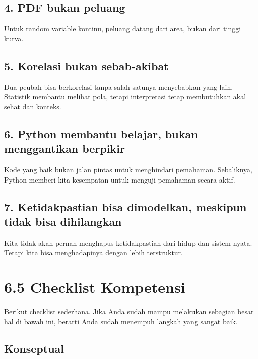 \documentclass[
  letterpaper,
  DIV=11,
  numbers=noendperiod]{scrreprt}
\begin{document}
\subsection{4. PDF bukan peluang}\label{pdf-bukan-peluang}

Untuk random variable kontinu, peluang datang dari area, bukan dari
tinggi kurva.

\subsection{5. Korelasi bukan
sebab-akibat}\label{korelasi-bukan-sebab-akibat}

Dua peubah bisa berkorelasi tanpa salah satunya menyebabkan yang lain.
Statistik membantu melihat pola, tetapi interpretasi tetap membutuhkan
akal sehat dan konteks.

\subsection{6. Python membantu belajar, bukan menggantikan
berpikir}\label{python-membantu-belajar-bukan-menggantikan-berpikir}

Kode yang baik bukan jalan pintas untuk menghindari pemahaman.
Sebaliknya, Python memberi kita kesempatan untuk menguji pemahaman
secara aktif.

\subsection{7. Ketidakpastian bisa dimodelkan, meskipun tidak bisa
dihilangkan}\label{ketidakpastian-bisa-dimodelkan-meskipun-tidak-bisa-dihilangkan}

Kita tidak akan pernah menghapus ketidakpastian dari hidup dan sistem
nyata. Tetapi kita bisa menghadapinya dengan lebih terstruktur.

\section{6.5 Checklist Kompetensi}\label{checklist-kompetensi}

Berikut checklist sederhana. Jika Anda sudah mampu melakukan sebagian
besar hal di bawah ini, berarti Anda sudah menempuh langkah yang sangat
baik.

\subsection{Konseptual}\label{konseptual}
\end{document}
